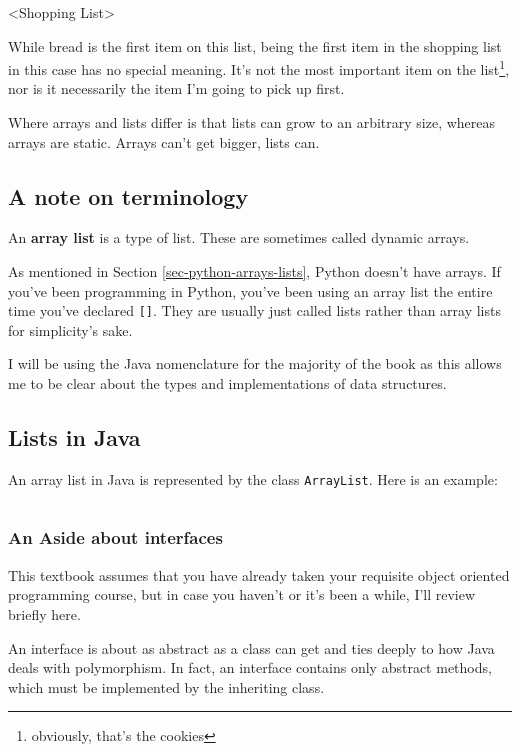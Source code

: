 <Shopping List>

While bread is the first item on this list, being the first item in the shopping list in this case has no special meaning.  It's not the most important item on the list\footnote{obviously, that's the cookies}, nor is it necessarily the item I'm going to pick up first.

Where arrays and lists differ is that lists can grow to an arbitrary size, whereas arrays are static.  Arrays can't get bigger, lists can.

\subsection*{A note on terminology}
An \textbf{array list} is a type of list.  These are sometimes called dynamic arrays.

As mentioned in Section \ref{sec-python-arrays-lists}, Python doesn't have arrays.  If you've been programming in Python, you've been using an array list the entire time you've declared \texttt{[]}.  They are usually just called lists rather than array lists for simplicity's sake.


I will be using the Java nomenclature for the majority of the book as this allows me to be clear about the types and implementations of data structures.

\subsection{Lists in Java}

An array list in Java is represented by the class \texttt{ArrayList}.  Here is an example:

\begin{verbatim}

\end{verbatim}

\subsubsection{An Aside about interfaces}
This textbook assumes that you have already taken your requisite object oriented programming course, but in case you haven't or it's been a while, I'll review briefly here.


An interface is about as abstract as a class can get and ties deeply to how Java deals with polymorphism.  In fact, an interface contains only abstract methods, which must be implemented by the inheriting class.


